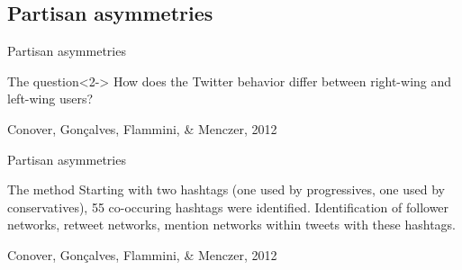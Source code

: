 \documentclass{beamer}
\begin{document}
\subsection{Partisan asymmetries}
\begin{frame}{Partisan asymmetries}
\begin{block}{The question}<2->
How does the Twitter behavior differ between right-wing and left-wing users?
\end{block}
\footnotesize{Conover, Gonçalves, Flammini, \& Menczer, 2012}
\end{frame}

\begin{frame}{Partisan asymmetries}
\begin{block}{The method}
Starting with two hashtags (one used by progressives, one used by conservatives), 55 co-occuring hashtags were identified. Identification of follower networks, retweet networks, mention networks within tweets with these hashtags.
\end{block}
\footnotesize{Conover, Gonçalves, Flammini, \& Menczer, 2012}
\end{frame}



{
\begin{frame}[plain]
\end{frame}
}
\end{document}
